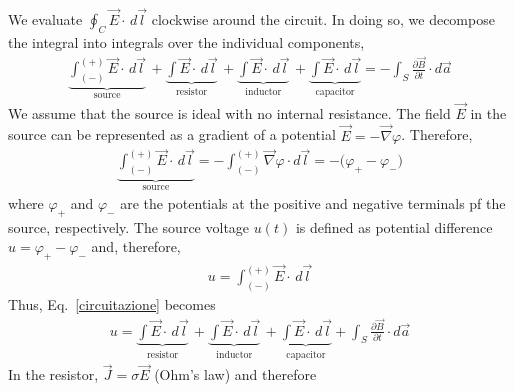 \documentclass[12pt,a4paper,oneside]{book}
\begin{document}
\begin{onehalfspace}
\begin{equation}
\begin{aligned}
	\end{aligned}
\end{equation} 
We evaluate $\oint_{C}\vec{E}\cdot\,d\vec{l}$ clockwise around the circuit. In doing so, we decompose the integral into integrals over the individual components,
\begin{equation}\label{circuitazione}
	\begin{aligned}
		\underbrace{\int_{(-)}^{(+)}\vec{E}\cdot\,d\vec{l}}_{\text{source}} \, + \underbrace{\int\vec{E}\cdot\,d\vec{l}}_{\text{resistor}} \, + 
		\underbrace{\int\vec{E}\cdot\,d\vec{l}}_{\text{inductor}} \, + 
		\underbrace{\int\vec{E}\cdot\,d\vec{l}}_{\text{capacitor}} = - \int_{S}\frac{\partial \vec{B}}{\partial t}\cdot d\vec{a}
	\end{aligned}
\end{equation} 
We assume that the source is ideal with no internal resistance. The field $\vec{E}$ in the source can be represented as a gradient of a potential $\vec{E}=-\vec{\nabla}\varphi$. Therefore,
\begin{equation*}
	\begin{aligned}
		\underbrace{\int_{(-)}^{(+)}\vec{E}\cdot\,d\vec{l}}_{\text{source}} = - \int_{(-)}^{(+)}\vec{\nabla}\varphi\cdot d\vec{l} = -\Big(\varphi_+ - \varphi_-\Big)
	\end{aligned}
\end{equation*} 
where $\varphi_+$ and $\varphi_-$ are the potentials at the positive and negative terminals pf the source, respectively. The source voltage $u(t)$ is defined as potential difference $u=\varphi_+ - \varphi_-$  and, therefore,
\begin{equation}
	\begin{aligned}
		u = \int_{(-)}^{(+)}\vec{E}\cdot\,d\vec{l}
	\end{aligned}
\end{equation} 
Thus, Eq.~\eqref{circuitazione} becomes
\begin{equation}\label{circuitazione2}
	\begin{aligned}
		u = \underbrace{\int\vec{E}\cdot\,d\vec{l}}_{\text{resistor}} \, + 
		\underbrace{\int\vec{E}\cdot\,d\vec{l}}_{\text{inductor}} \, + 
		\underbrace{\int\vec{E}\cdot\,d\vec{l}}_{\text{capacitor}} + \int_{S}\frac{\partial \vec{B}}{\partial t}\cdot d\vec{a}
	\end{aligned}
\end{equation} 
In the resistor, $\vec{J}=\sigma\vec{E}$ (Ohm's law) and therefore
\begin{equation}\label{res}
	\begin{aligned}

\end{aligned}
\end{equation}
\end{onehalfspace}
\end{document}
